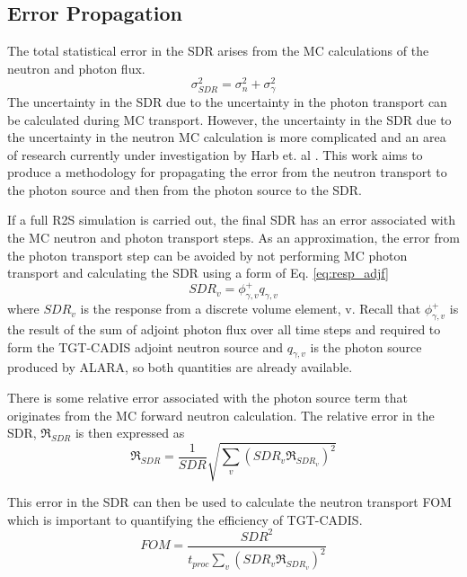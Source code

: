 \subsection{Error Propagation}\label{sec:error}
The total statistical error in the SDR
arises from the MC calculations of the neutron and photon flux.
\begin{equation}\label{eq:toterr}
	\sigma_{SDR}^{2} = \sigma_n^2 + \sigma_{\gamma}^2
\end{equation}
The uncertainty in the SDR due to the uncertainty in the photon transport can
be calculated during MC transport. However, the 
uncertainty in the SDR due to the uncertainty in the neutron MC
calculation is more complicated and an area of research currently under investigation by Harb et.
al \cite{harb_prelim}.  This work aims to produce a methodology for propagating the error from the
neutron transport to the photon source and then from the photon source to the
SDR.

If a full R2S simulation is carried out, the final SDR has an error associated
with the MC neutron and photon transport steps.  As an approximation, the error from the photon transport
step can be avoided by not performing MC photon transport and calculating the
SDR using a form of Eq. \ref{eq:resp_adjf}
\begin{equation}\label{eq:resp_v}
	SDR_v = \phi_{\gamma, v}^{+} q_{\gamma, v}
\end{equation}
where $SDR_v$ is the response from a discrete volume element, v.
Recall that $\phi_{\gamma, v}^{+}$ is the result of the sum of adjoint photon flux 
over all time steps and required to form the TGT-CADIS adjoint neutron source
and $q_{\gamma, v}$ is the photon source produced by ALARA, so both quantities
are already available.

There is some relative error associated with the photon source term that
originates from the MC forward neutron calculation.  
The relative error in the
SDR, $\Re_{SDR}$ is then expressed as 
\begin{equation}\label{eq:err}
	\Re_{SDR} = \frac{1}{SDR} \sqrt{\sum_v{(SDR_v \Re_{SDR_v})^2}}
\end{equation}

This error in the SDR can then be used to calculate the neutron transport
FOM \cite{eb_prelim}
which is important to quantifying the efficiency of TGT-CADIS.
\begin{equation}\label{eq:fom}
	FOM = \frac{SDR^2}{t_{proc}\sum_v{(SDR_v \Re_{SDR_v})^2}}
\end{equation}




